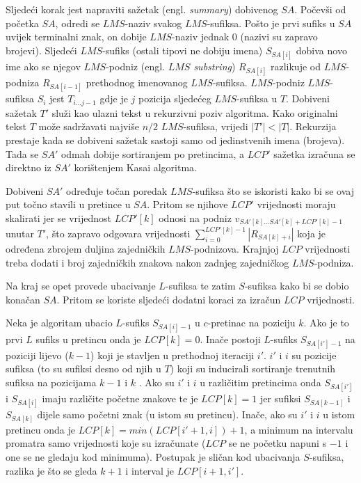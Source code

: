 \documentclass[times, utf8, proizvoljni, numeric]{fer}
\begin{document}
Sljedeći korak jest napraviti sažetak (engl. \textit{summary}) dobivenog $SA$. Počevši od početka $SA$, odredi se $LMS$-naziv svakog $LMS$-sufiksa. Pošto je prvi sufiks u $SA$ uvijek terminalni znak, on dobije $LMS$-naziv jednak $0$ (nazivi su zapravo brojevi). Sljedeći $LMS$-sufiks (ostali tipovi ne dobiju imena) $S_{SA[i]}$ dobiva novo ime ako se njegov $LMS$-podniz (engl. \textit{$LMS$ substring}) $R_{SA[i]}$ razlikuje od $LMS$-podniza $R_{SA[i-1]}$ prethodnog imenovanog $LMS$-sufiksa. $LMS$-podniz $LMS$-sufiksa $S_{i}$ jest $T_{i...j-1}$ gdje je $j$ pozicija sljedećeg $LMS$-sufiksa u $T$. Dobiveni sažetak $T'$ služi kao ulazni tekst u rekurzivni poziv algoritma. Kako originalni tekst $T$ može sadržavati najviše $n/2$ $LMS$-sufiksa, vrijedi $|T'|<|T|$. Rekurzija prestaje kada se dobiveni sažetak sastoji samo od jedinstvenih imena (brojeva). Tada se $SA'$ odmah dobije sortiranjem po pretincima, a $LCP'$ sažetka izračuna se direktno iz $SA'$ korištenjem Kasai algoritma.

Dobiveni $SA'$ određuje točan poredak $LMS$-sufiksa što se iskoristi kako bi se ovaj put točno stavili u pretince u $SA$. Pritom se njihove $LCP'$ vrijednosti moraju skalirati jer se vrijednost $LCP'[k]$ odnosi na podniz $v_{SA'[k]...SA'[k]+LCP'[k]-1}$ unutar $T'$, što zapravo odgovara vrijednosti $\sum_{i=0}^{LCP'[k]-1}|R_{SA[k]+i}|$ koja je određena zbrojem duljina zajedničkih $LMS$-podnizova. Krajnjoj $LCP$ vrijednosti treba dodati i broj zajedničkih znakova nakon zadnjeg zajedničkog $LMS$-podniza.

Na kraj se opet provede ubacivanje $L$-sufiksa te zatim $S$-sufiksa kako bi se dobio konačan $SA$. Pritom se koriste sljedeći dodatni koraci za izračun $LCP$ vrijednosti.

Neka je algoritam ubacio $L$-sufiks $S_{SA[i]-1}$ u $c$-pretinac na poziciju $k$. Ako je to prvi $L$ sufiks u pretincu onda je $LCP[k]=0$. Inače postoji $L$-sufiks $S_{SA[i']-1}$ na poziciji lijevo ($k-1$) koji je stavljen u prethodnoj iteraciji $i'$. $i'$ i $i$ su pozicije sufiksa (to su sufiksi desno od njih u $T$) koji su inducirali sortiranje trenutnih sufiksa na pozicijama $k-1$ i $k$ . Ako su $i'$ i $i$ u različitim pretincima onda $S_{SA[i']}$ i $S_{SA[i]}$ imaju različite početne znakove te je $LCP[k]=1$ jer sufiksi $S_{SA[k-1]}$ i $S_{SA[k]}$ dijele samo početni znak (u istom su pretincu). Inače, ako su $i'$ i $i$ u istom pretincu onda je $LCP[k]=min(LCP[i'+1,i])+1$, a minimum na intervalu promatra samo vrijednosti koje su izračunate ($LCP$ se ne početku napuni s $-1$ i one se ne gledaju kod minimuma). Postupak je sličan kod ubacivanja $S$-sufiksa, razlika je što se gleda $k+1$ i interval je $LCP[i+1,i']$.
\end{document}
